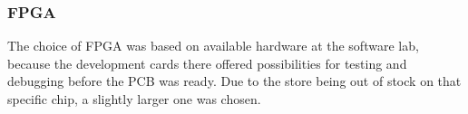 
\subsubsection{FPGA}

The choice of FPGA was based on available hardware at the software lab, because
the development cards there offered possibilities for testing and debugging
before the PCB was ready. Due to the store being out of stock on that specific
chip, a slightly larger one was chosen. 
